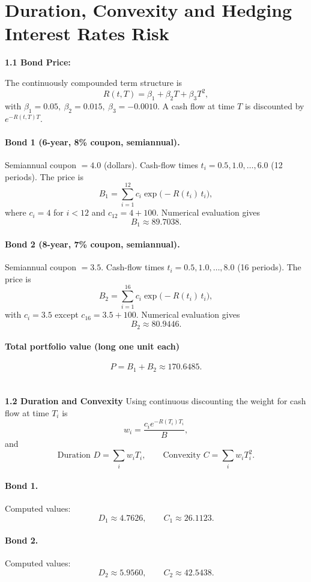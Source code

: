 \section{Duration, Convexity and Hedging Interest Rates Risk}
\textbf{1.1 Bond Price: }

The continuously compounded term structure is
\[
R(t,T)=\beta_1+\beta_2 T+\beta_3 T^2,
\]
with \(\beta_1=0.05,\ \beta_2=0.015,\ \beta_3=-0.0010\).
A cash flow at time \(T\) is discounted by \(e^{-R(t,T)T}\).

\paragraph{Bond 1 (6-year, 8\% coupon, semiannual).}
Semiannual coupon \(=4.0\) (dollars). Cash-flow times \(t_i = 0.5,1.0,\dots,6.0\) (12 periods).
The price is
\[
B_1=\sum_{i=1}^{12} c_i \exp\big(-R(t_i)\,t_i\big),
\]
where \(c_i=4\) for \(i<12\) and \(c_{12}=4+100\).
Numerical evaluation gives
\[
\boxed{B_1 \approx 89.7038.}
\]

\paragraph{Bond 2 (8-year, 7\% coupon, semiannual).}
Semiannual coupon \(=3.5\). Cash-flow times \(t_i = 0.5,1.0,\dots,8.0\) (16 periods).
The price is
\[
B_2=\sum_{i=1}^{16} c_i \exp\big(-R(t_i)\,t_i\big),
\]
with \(c_i=3.5\) except \(c_{16}=3.5+100\).
Numerical evaluation gives
\[
\boxed{B_2 \approx 80.9446.}
\]

\paragraph{Total portfolio value (long one unit each)}
\[
\boxed{P = B_1 + B_2 \approx 170.6485.}
\]
\\ \\ 
\textbf{1.2 Duration and Convexity}
Using continuous discounting the weight for cash flow at time $T_i$ is
\[
w_i=\frac{c_i e^{-R(T_i)T_i}}{B},
\]
and
\[
\text{Duration } D=\sum_i w_i T_i,\qquad
\text{Convexity } C=\sum_i w_i T_i^2 .
\]

\paragraph{Bond 1.}
Computed values:
\[
\boxed{D_1 \approx 4.7626,\qquad C_1 \approx 26.1123.}
\]

\paragraph{Bond 2.}
Computed values:
\[
\boxed{D_2 \approx 5.9560,\qquad C_2 \approx 42.5438.}
\]

